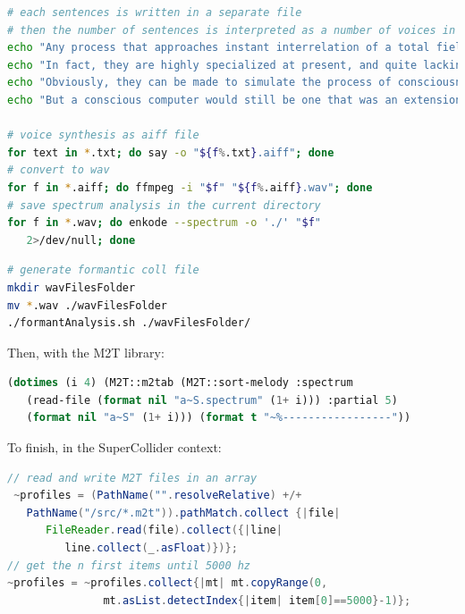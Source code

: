 \documentclass{book}
\begin{document}
\begin{lstlisting}[language=bash]
# each sentences is written in a separate file
# then the number of sentences is interpreted as a number of voices in order to make interesting combination done with ~OCWR and symmetric permutation
echo "Any process that approaches instant interrelation of a total field tends to raise itself to the level of conscious awareness, so that computers seem to think." > 1.txt
echo "In fact, they are highly specialized at present, and quite lacking in the full process of interrelation that makes for consciousness." > 2.txt
echo "Obviously, they can be made to simulate the process of consciousness, just as our electric global networks now begin to simulate the condition of our central nervous system." > 3.txt
echo "But a conscious computer would still be one that was an extension of our consciousness." > 4.txt

# voice synthesis as aiff file 
for text in *.txt; do say -o "${f%.txt}.aiff"; done
# convert to wav 
for f in *.aiff; do ffmpeg -i "$f" "${f%.aiff}.wav"; done
# save spectrum analysis in the current directory
for f in *.wav; do enkode --spectrum -o './' "$f" 
   2>/dev/null; done
\end{lstlisting}
\begin{lstlisting}[language=bash]
# generate formantic coll file
mkdir wavFilesFolder
mv *.wav ./wavFilesFolder
./formantAnalysis.sh ./wavFilesFolder/
\end{lstlisting}

Then, with the M2T library:

 \begin{lstlisting}[basicstyle=\footnotesize\ttfamily,language=Lisp]
(dotimes (i 4) (M2T::m2tab (M2T::sort-melody :spectrum 
   (read-file (format nil "a~S.spectrum" (1+ i))) :partial 5) 
   (format nil "a~S" (1+ i))) (format t "~%-----------------"))
\end{lstlisting}

To finish, in the SuperCollider context:

 \begin{lstlisting}[basicstyle=\footnotesize\ttfamily,language=Java]
// read and write M2T files in an array
 ~profiles = (PathName("".resolveRelative) +/+ 
   PathName("/src/*.m2t")).pathMatch.collect {|file| 
      FileReader.read(file).collect({|line| 
         line.collect(_.asFloat)})};
// get the n first items until 5000 hz
~profiles = ~profiles.collect{|mt| mt.copyRange(0, 
               mt.asList.detectIndex{|item| item[0]==5000}-1)};
 \end{lstlisting}
\end{document}

